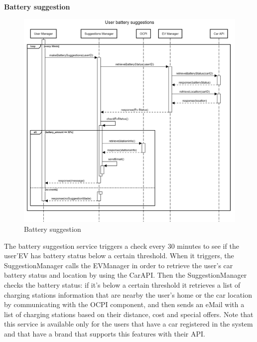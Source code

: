 \documentclass[table, 12pt]{article}
\begin{document}
\textbf{Battery suggestion}
\begin{center}
    \begin{figure}[H]
        \includegraphics[scale=0.20, center]{assets/sequenceDiagrams/battery suggestions.png}
        \caption{Battery suggestion}
        \label{Battery suggestion}
    \end{figure}
\end{center}
\newpage
The battery suggestion service triggers a check every 30 minutes to see if the user'EV has battery status below a certain threshold.
When it triggers, the SuggestionManager calls the EVManager in order to retrieve the user's car battery status and location by using the CarAPI.
Then the SuggestionManager checks the battery status: if it's below a certain threshold it retrieves a list of charging stations information that are nearby the user's home or the car location by communicating with the OCPI component, and then sends an eMail with a list of charging stations based on their distance, cost and special offers.
Note that this service is available only for the users that have a car registered in the system and that have a brand that supports this features with their API.
\newpage
\end{document}
